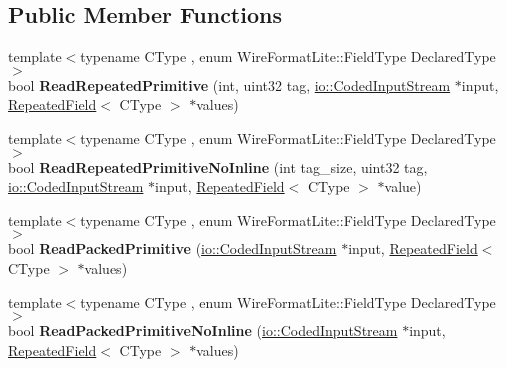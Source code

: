 \subsection*{Public Member Functions}
\begin{DoxyCompactItemize}
\item 
\mbox{\label{classgoogle_1_1protobuf_1_1internal_1_1WireFormatLite_a8f11057d4368fb59ff8d947dfdb77492}} 
{\footnotesize template$<$typename C\+Type , enum Wire\+Format\+Lite\+::\+Field\+Type Declared\+Type$>$ }\\bool {\bfseries Read\+Repeated\+Primitive} (int, uint32 tag, \hyperlink{classgoogle_1_1protobuf_1_1io_1_1CodedInputStream}{io\+::\+Coded\+Input\+Stream} $\ast$input, \hyperlink{classgoogle_1_1protobuf_1_1RepeatedField}{Repeated\+Field}$<$ C\+Type $>$ $\ast$values)
\item 
\mbox{\label{classgoogle_1_1protobuf_1_1internal_1_1WireFormatLite_a7ee2efaaaca2ae0ebe0ec28bfa12eafa}} 
{\footnotesize template$<$typename C\+Type , enum Wire\+Format\+Lite\+::\+Field\+Type Declared\+Type$>$ }\\bool {\bfseries Read\+Repeated\+Primitive\+No\+Inline} (int tag\+\_\+size, uint32 tag, \hyperlink{classgoogle_1_1protobuf_1_1io_1_1CodedInputStream}{io\+::\+Coded\+Input\+Stream} $\ast$input, \hyperlink{classgoogle_1_1protobuf_1_1RepeatedField}{Repeated\+Field}$<$ C\+Type $>$ $\ast$value)
\item 
\mbox{\label{classgoogle_1_1protobuf_1_1internal_1_1WireFormatLite_ad1cc932a6eceaba8e943285d5db3a1ca}} 
{\footnotesize template$<$typename C\+Type , enum Wire\+Format\+Lite\+::\+Field\+Type Declared\+Type$>$ }\\bool {\bfseries Read\+Packed\+Primitive} (\hyperlink{classgoogle_1_1protobuf_1_1io_1_1CodedInputStream}{io\+::\+Coded\+Input\+Stream} $\ast$input, \hyperlink{classgoogle_1_1protobuf_1_1RepeatedField}{Repeated\+Field}$<$ C\+Type $>$ $\ast$values)
\item 
\mbox{\label{classgoogle_1_1protobuf_1_1internal_1_1WireFormatLite_a79609687249d9f028a7020978b3042ce}} 
{\footnotesize template$<$typename C\+Type , enum Wire\+Format\+Lite\+::\+Field\+Type Declared\+Type$>$ }\\bool {\bfseries Read\+Packed\+Primitive\+No\+Inline} (\hyperlink{classgoogle_1_1protobuf_1_1io_1_1CodedInputStream}{io\+::\+Coded\+Input\+Stream} $\ast$input, \hyperlink{classgoogle_1_1protobuf_1_1RepeatedField}{Repeated\+Field}$<$ C\+Type $>$ $\ast$values)

\end{DoxyCompactItemize}
